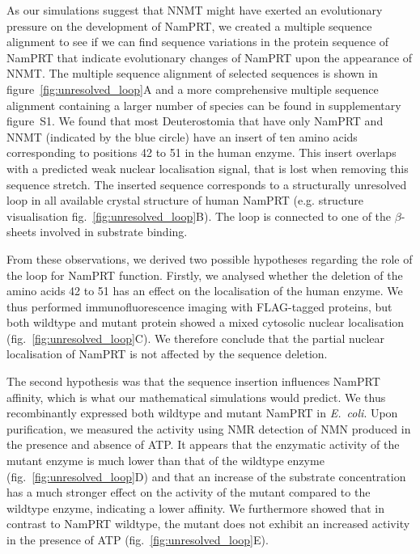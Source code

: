 As our simulations suggest that NNMT might have exerted an evolutionary pressure on the development of NamPRT, we created a multiple sequence alignment to see if we can find sequence variations in the protein sequence of NamPRT that indicate evolutionary changes of NamPRT upon the appearance of NNMT. The multiple sequence alignment of selected sequences is shown in figure~\ref{fig:unresolved_loop}A and a more comprehensive multiple sequence alignment containing a larger number of species can be found in supplementary figure~S1. We found that most Deuterostomia that have only NamPRT and NNMT (indicated by the blue circle) have an insert of ten amino acids corresponding to positions 42 to 51 in the human enzyme. This insert overlaps with a predicted weak nuclear localisation signal, that is lost when removing this sequence stretch. The inserted sequence corresponds to a structurally unresolved loop in all available crystal structure of human NamPRT (e.g. \cite{Wang2006} structure visualisation fig.~\ref{fig:unresolved_loop}B). The loop is connected to one of the $\beta$-sheets involved in substrate binding.

From these observations, we derived two possible hypotheses regarding the role of the loop for NamPRT function. Firstly, we analysed whether the deletion of the amino acids 42 to 51 has an effect on the localisation of the human enzyme. We thus performed immunofluorescence imaging with FLAG-tagged proteins, but both wildtype and mutant protein showed a mixed cytosolic nuclear localisation (fig.~\ref{fig:unresolved_loop}C). We therefore conclude that the partial nuclear localisation of NamPRT is not affected by the sequence deletion.

The second hypothesis was that the sequence insertion influences NamPRT affinity, which is what our mathematical simulations would predict. We thus recombinantly expressed both wildtype and mutant NamPRT in \textit{E.~coli}. Upon purification, we measured the activity using NMR detection of NMN produced in the presence and absence of ATP. It appears that the enzymatic activity of the mutant enzyme is much lower than that of the wildtype enzyme (fig.~\ref{fig:unresolved_loop}D) and that an increase of the substrate concentration has a much stronger effect on the activity of the mutant compared to the wildtype enzyme, indicating a lower affinity. We furthermore showed that in contrast to NamPRT wildtype, the mutant does not exhibit an increased activity in the presence of ATP (fig.~\ref{fig:unresolved_loop}E).


